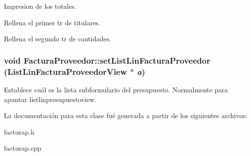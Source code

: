 Impresion de los totales.

Rellena el primer tr de titulares.

Rellena el segundo tr de cantidades. 
\subsubsection{\setlength{\rightskip}{0pt plus 5cm}void Factura\-Proveedor::set\-List\-Lin\-Factura\-Proveedor ({\bf List\-Lin\-Factura\-Proveedor\-View} $\ast$ {\em a})\hspace{0.3cm}{\tt  [inline]}}\label{classFacturaProveedor_a28}


Establece cu\'{a}l es la lista subformulario del presupuesto. Normalmente para apuntar listlinpresupuestoview. 

La documentaci\'{o}n para esta clase fu\'{e} generada a partir de los siguientes archivos:\begin{CompactItemize}
\item 
facturap.h\item 
facturap.cpp\end{CompactItemize}
